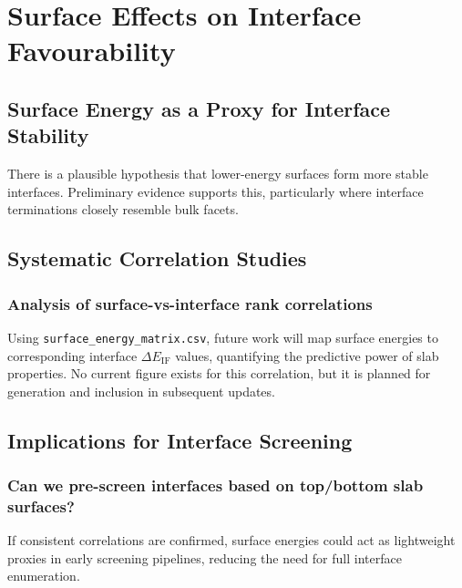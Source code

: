 \section{Surface Effects on Interface Favourability}

\label{section:surface_effects}

\subsection{Surface Energy as a Proxy for Interface Stability}

There is a plausible hypothesis that lower-energy surfaces form more stable interfaces. Preliminary evidence supports this, particularly where interface terminations closely resemble bulk facets.

\subsection{Systematic Correlation Studies}

\subsubsection{Analysis of surface-vs-interface rank correlations}

Using \texttt{surface\_energy\_matrix.csv}, future work will map surface energies to corresponding interface $\Delta E_\mathrm{IF}$ values, quantifying the predictive power of slab properties. No current figure exists for this correlation, but it is planned for generation and inclusion in subsequent updates.


\subsection{Implications for Interface Screening}

\subsubsection{Can we pre-screen interfaces based on top/bottom slab surfaces?}

If consistent correlations are confirmed, surface energies could act as lightweight proxies in early screening pipelines, reducing the need for full interface enumeration.